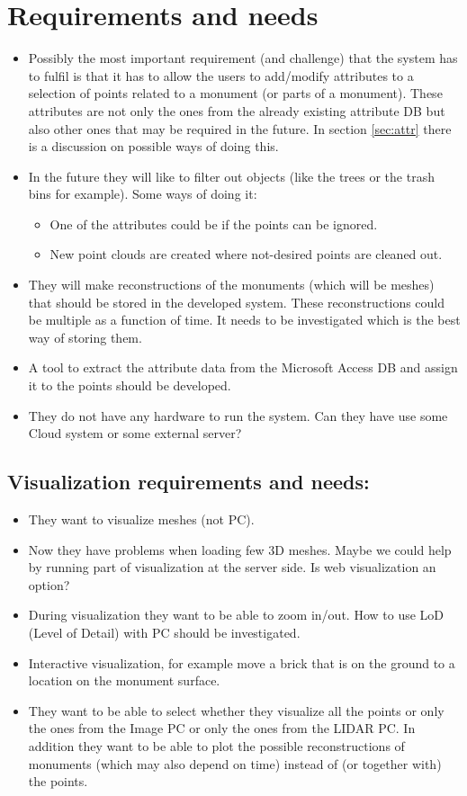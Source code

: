 \documentclass[a4paper,11pt]{article}
\begin{document}
\section{Requirements and needs}
\label{sec:req}

\begin{itemize}
	\item Possibly the most important requirement (and challenge) that the system has to fulfil is that it has to allow the users to add/modify attributes to a selection of points related to a monument (or parts of a monument). These attributes are not only the ones from the already existing attribute DB but also other ones that may be required in the future. In section \ref{sec:attr} there is a discussion on possible ways of doing this.
	\item In the future they will like to filter out objects (like the trees or the trash bins for example). Some ways of doing it:
	\begin{itemize}
		\item One of the attributes could be if the points can be ignored.
		\item New point clouds are created where not-desired points are cleaned out.
	\end{itemize}
	\item They will make reconstructions of the monuments (which will be meshes) that should be stored in the developed system. These reconstructions could be multiple as a function of time. It needs to be investigated which is the best way of storing them.
	\item A tool to extract the attribute data from the Microsoft Access DB and assign it to the points should be developed.
	\item They do not have any hardware to run the system. Can they have use some Cloud system or some external server?
\end{itemize}

\subsection*{Visualization requirements and needs:}

\begin{itemize}
	\item They want to visualize meshes (not PC).
	\item Now they have problems when loading few 3D meshes. Maybe we could help by running part of visualization at the server side. Is web visualization an option?
	\item During visualization they want to be able to zoom in/out. How to use LoD (Level of Detail) with PC should be investigated.
	\item Interactive visualization, for example move a brick that is on the ground to a location on the monument surface.
	\item They want to be able to select whether they visualize all the points or only the ones from the Image PC or only the ones from the LIDAR PC. In addition they want to be able to plot the possible reconstructions of monuments (which may also depend on time) instead of (or together with) the points.
\end{itemize}
\end{document}
